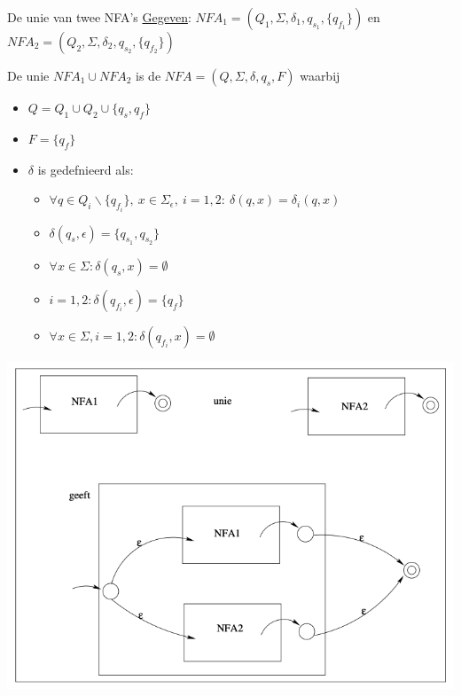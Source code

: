 \begin{pro}{De unie van twee NFA's}
    \underline{Gegeven}: ${NFA}_1 = (Q_1,\Sigma, \delta_1, q_{s}_1, \{q_{f}_1\})$ en ${NFA}_2 = (Q_2,\Sigma, \delta_2, q_{s}_2, \{q_{f}_2\})$ \\

    \begin{minipage}{.63\textwidth}
        De unie ${NFA}_1 \cup {NFA}_2$ is de $NFA = (Q,\Sigma, \delta, q_s, F)$ waarbij

        \begin{itemize}
            \item $Q = Q_1 \cup Q_2 \cup \{ q_s, q_f \}$
            \item $F = \{q_f\}$
            \item $\delta$ is gedefnieerd als:
            \begin{itemize}
                \item $\forall q \in Q_i\backslash\{q_{f}_{i}\}, \ x \in \Sigma_{\epsilon}, \ i = 1,2: \ \delta(q,x) = \delta_i(q,x)$
                \item $\delta(q_s, \epsilon) = \{q_{s}_{1}, q_{s}_{2}\}$
                \item $\forall x \in \Sigma: \delta(q_s, x) = \emptyset$
                \item $i = 1,2: \delta(q_{f}_{i}, \epsilon) = \{q_f\}$
                \item $\forall x \in \Sigma, i = 1,2: \delta(q_{f}_{i}, x) = \emptyset$
            \end{itemize}
        \end{itemize}
    \end{minipage}
    \begin{minipage}{.33\textwidth}
        \includegraphics[scale = 0.225]{Images/UnieNFA}
    \end{minipage}
\end{pro}

